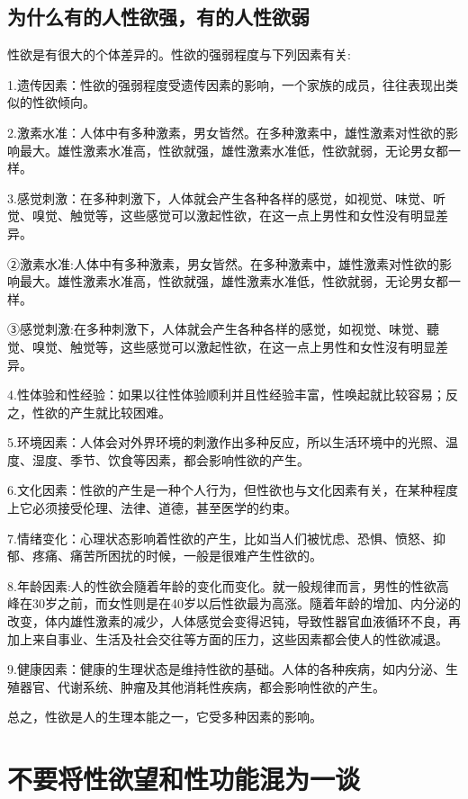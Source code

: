 \documentclass[12pt,UTF8]{ctexbook}
\begin{document}
\section{为什么有的人性欲强，有的人性欲弱}

性欲是有很大的个体差异的。性欲的强弱程度与下列因素有关:

1.遗传因素：性欲的强弱程度受遗传因素的影响，一个家族的成员，往往表现出类似的性欲倾向。

2.激素水准：人体中有多种激素，男女皆然。在多种激素中，雄性激素对性欲的影响最大。雄性激素水准高，性欲就强，雄性激素水准低，性欲就弱，无论男女都一样。

3.感觉刺激：在多种刺激下，人体就会产生各种各样的感觉，如视觉、味觉、听觉、嗅觉、触觉等，这些感觉可以激起性欲，在这一点上男性和女性没有明显差异。

②激素水准:人体中有多种激素，男女皆然。在多种激素中，雄性激素对性欲的影响最大。雄性激素水准高，性欲就强，雄性激素水准低，性欲就弱，无论男女都一样。

③感觉刺激:在多种刺激下，人体就会产生各种各样的感觉，如视觉、味觉、聽觉、嗅觉、触觉等，这些感觉可以激起性欲，在这一点上男性和女性沒有明显差异。

4.性体验和性经验：如果以往性体验顺利并且性经验丰富，性唤起就比较容易；反之，性欲的产生就比较困难。

5.环境因素：人体会对外界环境的刺激作出多种反应，所以生活环境中的光照、温度、湿度、季节、饮食等因素，都会影响性欲的产生。

6.文化因素：性欲的产生是一种个人行为，但性欲也与文化因素有关，在某种程度上它必须接受伦理、法律、道德，甚至医学的约束。

7.情绪变化：心理状态影响着性欲的产生，比如当人们被忧虑、恐惧、愤怒、抑郁、疼痛、痛苦所困扰的时候，一般是很难产生性欲的。

8.年龄因素:人的性欲会隨着年龄的变化而变化。就一般规律而言，男性的性欲高峰在30岁之前，而女性则是在40岁以后性欲最为高涨。隨着年龄的增加、内分泌的改变，体内雄性激素的减少，人体感觉会变得迟钝，导致性器官血液循环不良，再加上来自事业、生活及社会交往等方面的压力，这些因素都会使人的性欲减退。

9.健康因素：健康的生理状态是维持性欲的基础。人体的各种疾病，如内分泌、生殖器官、代谢系统、肿瘤及其他消耗性疾病，都会影响性欲的产生。

总之，性欲是人的生理本能之一，它受多种因素的影响。

\chapter{不要将性欲望和性功能混为一谈}
\end{document}
